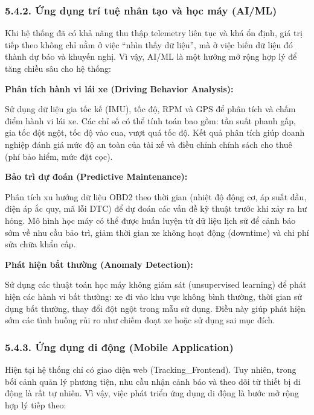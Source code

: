 \documentclass[a4paper]{extarticle}
\begin{document}
\subsubsection{5.4.2. Ứng dụng trí tuệ nhân tạo và học máy
(AI/ML)}\label{542-ux1ee9ng-dux1ee5ng-truxed-tuux1ec7-nhuxe2n-tux1ea1o-vuxe0-hux1ecdc-muxe1y-aiml}

Khi hệ thống đã có khả năng thu thập telemetry liên tục và khá ổn định,
giá trị tiếp theo không chỉ nằm ở việc ``nhìn thấy dữ liệu'', mà ở việc
biến dữ liệu đó thành dự báo và khuyến nghị. Vì vậy, AI/ML là một hướng
mở rộng hợp lý để tăng chiều sâu cho hệ thống:

\textbf{Phân tích hành vi lái xe (Driving Behavior Analysis):}

Sử dụng dữ liệu gia tốc kế (IMU), tốc độ, RPM và GPS để phân tích và
chấm điểm hành vi lái xe. Các chỉ số có thể tính toán bao gồm: tần suất
phanh gấp, gia tốc đột ngột, tốc độ vào cua, vượt quá tốc độ. Kết quả
phân tích giúp doanh nghiệp đánh giá mức độ an toàn của tài xế và điều
chỉnh chính sách cho thuê (phí bảo hiểm, mức đặt cọc).

\textbf{Bảo trì dự đoán (Predictive Maintenance):}

Phân tích xu hướng dữ liệu OBD2 theo thời gian (nhiệt độ động cơ, áp
suất dầu, điện áp ắc quy, mã lỗi DTC) để dự đoán các vấn đề kỹ thuật
trước khi xảy ra hư hỏng. Mô hình học máy có thể được huấn luyện từ dữ
liệu lịch sử để cảnh báo sớm về nhu cầu bảo trì, giảm thời gian xe không
hoạt động (downtime) và chi phí sửa chữa khẩn cấp.

\textbf{Phát hiện bất thường (Anomaly Detection):}

Sử dụng các thuật toán học máy không giám sát (unsupervised learning) để
phát hiện các hành vi bất thường: xe đi vào khu vực không bình thường,
thời gian sử dụng bất thường, thay đổi đột ngột trong mẫu sử dụng. Điều
này giúp phát hiện sớm các tình huống rủi ro như chiếm đoạt xe hoặc sử
dụng sai mục đích.

\subsubsection{5.4.3. Ứng dụng di động (Mobile
Application)}\label{543-ux1ee9ng-dux1ee5ng-di-ux111ux1ed9ng-mobile-application}

Hiện tại hệ thống chỉ có giao diện web (Tracking\_Frontend). Tuy nhiên,
trong bối cảnh quản lý phương tiện, nhu cầu nhận cảnh báo và theo dõi từ
thiết bị di động là rất tự nhiên. Vì vậy, việc phát triển ứng dụng di
động là bước mở rộng hợp lý tiếp theo:
\end{document}
